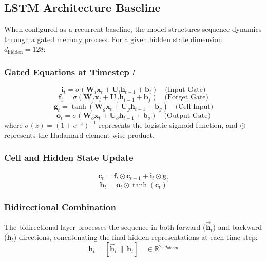 \documentclass[10pt,journal,compsoc,twocolumn]{IEEEtran}
\begin{document}
\subsection{LSTM Architecture Baseline}
When configured as a recurrent baseline, the model structures sequence dynamics through a gated memory process. For a given hidden state dimension $d_{\text{hidden}} = 128$:

\subsubsection{Gated Equations at Timestep $t$}
\begin{equation}
\mathbf{i}_t = \sigma\left(\mathbf{W}_i \mathbf{x}_t + \mathbf{U}_i \mathbf{h}_{t-1} + \mathbf{b}_i\right) \quad \text{(Input Gate)}
\end{equation}
\begin{equation}
\mathbf{f}_t = \sigma\left(\mathbf{W}_f \mathbf{x}_t + \mathbf{U}_f \mathbf{h}_{t-1} + \mathbf{b}_f\right) \quad \text{(Forget Gate)}
\end{equation}
\begin{equation}
\tilde{\mathbf{g}}_t = \tanh\left(\mathbf{W}_g \mathbf{x}_t + \mathbf{U}_g \mathbf{h}_{t-1} + \mathbf{b}_g\right) \quad \text{(Cell Input)}
\end{equation}
\begin{equation}
\mathbf{o}_t = \sigma\left(\mathbf{W}_o \mathbf{x}_t + \mathbf{U}_o \mathbf{h}_{t-1} + \mathbf{b}_o\right) \quad \text{(Output Gate)}
\end{equation}
where $\sigma(z) = (1 + e^{-z})^{-1}$ represents the logistic sigmoid function, and $\odot$ represents the Hadamard element-wise product.

\subsubsection{Cell and Hidden State Update}
\begin{equation}
\mathbf{c}_t = \mathbf{f}_t \odot \mathbf{c}_{t-1} + \mathbf{i}_t \odot \tilde{\mathbf{g}}_t
\end{equation}
\begin{equation}
\mathbf{h}_t = \mathbf{o}_t \odot \tanh\left(\mathbf{c}_t\right)
\end{equation}

\subsubsection{Bidirectional Combination}
The bidirectional layer processes the sequence in both forward ($\vec{\mathbf{h}}_t$) and backward ($\overleftarrow{\mathbf{h}}_t$) directions, concatenating the final hidden representations at each time step:
\begin{equation}
\tilde{\mathbf{h}}_t = \left[ \vec{\mathbf{h}}_t \,\|\, \overleftarrow{\mathbf{h}}_t \right] \quad \in \mathbb{R}^{2 \cdot d_{\text{hidden}}}
\end{equation}
\end{document}
